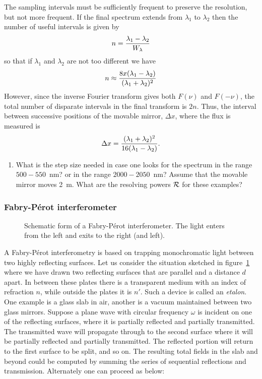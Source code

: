 \documentclass{article}
\def\cl#1{{\cal #1}}               %
\begin{document}
The sampling intervals must be sufficiently frequent to preserve the resolution, but not more frequent. If the final spectrum extends from $\lambda_1$ to $\lambda_2$ then the
number of useful intervals is given by 
\[
n={\lambda_1-\lambda_2\over W_\lambda}
\]
so that if $\lambda_1$ and $\lambda_2$ are not too different we have
\[
n\approx{8x(\lambda_1-\lambda_2)\over(\lambda_1+\lambda_2)^2}
\]
However, since the inverse Fourier transform gives both $F(\nu)$ and $F(-\nu)$, the total
number of disparate intervals in the final transform is $2n$. Thus, the interval between successive positions of the movable mirror, $\Delta x$, where the flux is measured is
\[
\Delta x={(\lambda_1+\lambda_2)^2\over 16(\lambda_1-\lambda_2)}.
\]


\begin{enumerate}
\setcounter{enumi}{\value{count}}
\item What is the step size needed in case one looks for the spectrum
  in the range $500-550$~nm? or in the range $2000-2050$~nm? Assume
  that the movable mirror moves 2~m. What are the resolving powers
  $\cl{R}$ for these examples?
\setcounter{count}{\value{enumi}}
\end{enumerate}


\subsubsection{Fabry-P\'erot interferometer}

\begin{figure}[h]
  \centering  {}
  \caption{Schematic form of a Fabry-P\'erot interferometer. The light enters from the 
left and exits to the right (and left).}
  \label{fig:fabry-perot-schematic}
\end{figure}

A Fabry-P\'erot interferometry is based on trapping monochromatic light between two
highly reflecting surfaces. Let us consider the situation sketched in figure~\ref{fig:fabry-perot-schematic} where we have drawn two reflecting surfaces that are parallel and a distance $d$ apart. In between these plates there is a transparent medium with an index of refraction $n$, while outside the plates it is $n'$. Such a device is called an {\it etalon}. One example is a glass slab in air, another is a vacuum maintained between two glass mirrors. Suppose a plane wave with circular frequency $\omega$ is incident on one of the reflecting surfaces, where it is partially reflected and partially transmitted. The transmitted wave will propagate through to the second surface where it will be partially reflected and partially transmitted. The reflected portion will return to the first surface to be split, and so on. The resulting total fields in the slab
and beyond could be computed by summing the series of sequential reflections and transmission. Alternately one can proceed as below:
\end{document}

